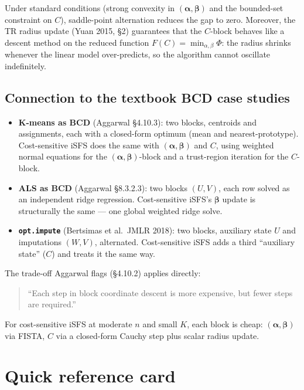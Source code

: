 \documentclass[11pt,a4paper]{article}
\begin{document}
Under standard conditions (strong convexity in $(\boldsymbol{\alpha}, \boldsymbol{\beta})$ and the bounded-set constraint on $C$), saddle-point alternation reduces the gap to zero. Moreover, the TR radius update (Yuan 2015, \S 2) guarantees that the $C$-block behaves like a descent method on the reduced function $F(C) = \min_{\alpha,\beta} \Phi$: the radius shrinks whenever the linear model over-predicts, so the algorithm cannot oscillate indefinitely.

\subsection{Connection to the textbook BCD case studies}

\begin{itemize}[leftmargin=*,itemsep=2pt]
  \item \textbf{K-means as BCD} (Aggarwal \S 4.10.3): two blocks, centroids and assignments, each with a closed-form optimum (mean and nearest-prototype). Cost-sensitive iSFS does the same with $(\boldsymbol{\alpha}, \boldsymbol{\beta})$ and $C$, using weighted normal equations for the $(\boldsymbol\alpha,\boldsymbol\beta)$-block and a trust-region iteration for the $C$-block.
  \item \textbf{ALS as BCD} (Aggarwal \S 8.3.2.3): two blocks $(U, V)$, each row solved as an independent ridge regression. Cost-sensitive iSFS's $\boldsymbol{\beta}$ update is structurally the same --- one global weighted ridge solve.
  \item \textbf{\texttt{opt.impute}} (Bertsimas et al.\ JMLR 2018): two blocks, auxiliary state $U$ and imputations $(W, V)$, alternated. Cost-sensitive iSFS adds a third ``auxiliary state'' ($C$) and treats it the same way.
\end{itemize}

The trade-off Aggarwal flags (\S 4.10.2) applies directly:

\begin{quote}
``Each step in block coordinate descent is more expensive, but fewer steps are required.''
\end{quote}

For cost-sensitive iSFS at moderate $n$ and small $K$, each block is cheap: $(\boldsymbol\alpha,\boldsymbol\beta)$ via FISTA, $C$ via a closed-form Cauchy step plus scalar radius update.

\section{Quick reference card}
\end{document}
